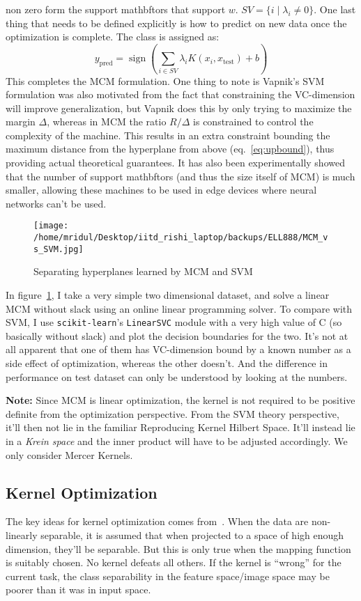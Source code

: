 \documentclass[11pt]{article}
\begin{document}
non zero form the support mathbftors that support $w$.
$SV=\{i\;\lvert\;\lambda_i\ne 0\}$. One last
thing that needs to be defined explicitly is how to predict on new data once the
optimization is complete. The class is assigned as:
\[y_{\text{pred}}=\operatorname{sign}\left(\sum_{i\in
SV}\lambda_iK(x_i,x_{\text{test}})+b\right)\]
This completes the MCM formulation. One thing to note is Vapnik's SVM
formulation was also motivated from the fact that constraining the VC-dimension
will improve generalization, but Vapnik does this by only trying to maximize the
margin $\Delta$, whereas in MCM the ratio $R/\Delta$ is constrained to control the
complexity of the machine. This results in an extra constraint bounding the
maximum distance from the hyperplane from above (eq.~\ref{eq:upbound}), thus
providing actual theoretical guarantees. It has also been experimentally showed
that the number of support mathbftors (and thus the size itself of MCM) is much
smaller, allowing these machines to be used in edge devices where neural
networks can't be used.
\begin{figure}
    \centering
    \texttt{[image: /home/mridul/Desktop/iitd\_rishi\_laptop/backups/ELL888/MCM\_vs\_SVM.jpg]}
    \caption{\label{fig:mcmvsvm}Separating hyperplanes learned by MCM and SVM}
\end{figure}
In figure~\ref{fig:mcmvsvm}, I take a very simple two dimensional dataset, and
solve a linear MCM without slack using an online linear programming solver. To compare with SVM, I
use \texttt{scikit-learn}'s \texttt{LinearSVC} module with a very high value of
C (so basically without slack) and plot the decision boundaries for the two.
It's not at all apparent that one of them has VC-dimension bound by a known
number as a side effect of optimization, whereas the other doesn't. And the
difference in performance on test dataset can only be understood by looking at
the numbers.\par
{\bf Note:} Since MCM is linear optimization, the kernel is not required to be
positive definite from the optimization perspective. From the SVM theory
perspective, it'll then not lie in the familiar Reproducing Kernel Hilbert
Space. It'll instead lie in a {\em Krein space} and the inner product will have
to be adjusted accordingly. We only consider Mercer Kernels.
\afterpage{\clearpage}
\subsection{Kernel Optimization}
The key ideas for kernel optimization comes from~\cite{amari}. When the data are
non-linearly separable, it is assumed that when projected to a space of high
enough dimension, they'll be separable. But this is only true when the
mapping function is suitably chosen. No kernel defeats all
others. If the kernel is ``wrong'' for the current task, the class separability
in the feature space/image space may be poorer than it was in input space.
\end{document}
